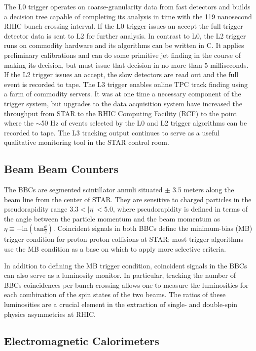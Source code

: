 The L0 trigger operates on coarse-granularity data from fast detectors and builds a decision tree capable of completing its analysis in time with the 119 nanosecond RHIC bunch crossing interval.  If the L0 trigger issues an accept the full trigger detector data is sent to L2 for further analysis.  In contrast to L0, the L2 trigger runs on commodity hardware and its algorithms can be written in C.  It applies preliminary calibrations and can do some primitive jet finding in the course of making its decision, but must issue that decision in no more than 5 milliseconds.  If the L2 trigger issues an accept, the slow detectors are read out and the full event is recorded to tape.  The L3 trigger \cite{Adler:2002ab} enables online TPC track finding using a farm of commodity servers.  It was at one time a necessary component of the trigger system, but upgrades to the data acquisition system have increased the throughput from STAR to the RHIC Computing Facility (RCF) to the point where the $\sim$50 Hz of events selected by the L0 and L2 trigger algorithms can be recorded to tape.  The L3 tracking output continues to serve as a useful qualitative monitoring tool in the STAR control room.

\subsection{Beam Beam Counters}

The BBCs \cite{Kiryluk:2005gg} are segmented scintillator annuli situated $\pm$ 3.5 meters along the beam line from the center of STAR.  They are sensitive to charged particles in the pseudorapidity range $3.3 < |\eta| < 5.0$, where pseudorapidity is defined in terms of the angle between the particle momentum and the beam momentum as $\eta \equiv -\mathrm{ln}\left(\mathrm{tan} \frac{\theta}{2}\right)$.  Coincident signals in both BBCs define the minimum-bias (MB) trigger condition for proton-proton collisions at STAR; most trigger algorithms use the MB condition as a base on which to apply more selective criteria.

In addition to defining the MB trigger condition, coincident signals in the BBCs can also serve as a luminosity monitor.  In particular, tracking the number of BBCs coincidences per bunch crossing allows one to measure the luminosities for each combination of the spin states of the two beams.  The ratios of these luminosities are a crucial element in the extraction of single- and double-spin physics asymmetries at RHIC.

\subsection{Electromagnetic Calorimeters}

